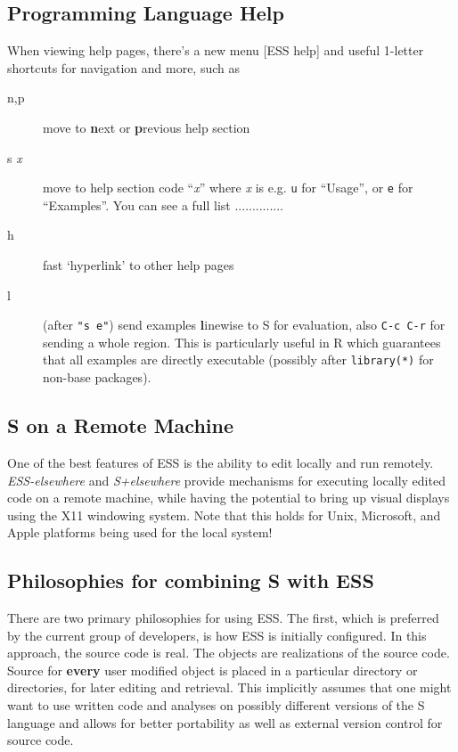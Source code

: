 \documentclass{article}
\begin{document}
\subsection{Programming Language Help}
\label{sec:S:help}
When viewing help pages, there's a new menu \textsf{[ESS help]} and
useful 1-letter shortcuts for navigation and more, such as
\begin{description}
\item[n,p] move to \textbf{n}ext or \textbf{p}revious help section
\item[s \textit{x}] move to help section code ``\textit{x}'' where
  \textit{x} is e.g. \texttt{u} for ``Usage'', or \texttt{e} for
  ``Examples''.  You can see a full list ..............

\item[h] fast `hyperlink' to other help pages

\item[l] (after \texttt{"s e"}) send examples \textbf{l}inewise to S for
  evaluation, also \texttt{C-c C-r} for sending a whole region.  This 
  is particularly useful in R which guarantees that all examples are
  directly executable (possibly after \texttt{library(*)} for non-base
  packages).
\end{description}

\subsection{S on a Remote Machine}
\label{sec:S:remote}

One of the best features of ESS is the ability to edit locally and run
remotely.  \textit{ESS-elsewhere} and \textit{S+elsewhere} provide
mechanisms for executing locally edited code on a remote machine,
while having the potential to bring up visual displays using the X11
windowing system.  Note that this holds for Unix, Microsoft, and Apple
platforms being used for the local system!

\subsection{Philosophies for combining S with ESS}
\label{sec:S:philosophy}

There are two primary philosophies for using ESS.  The first, which is
preferred by the current group of developers, is how ESS is initially
configured.  In this approach, the source code is real.  The objects
are realizations of the source code.  Source for \textbf{every} user
modified object is placed in a particular directory or directories,
for later editing and retrieval.  This implicitly assumes that one
might want to use written code and analyses on possibly different
versions of the S language and allows for better portability as well
as external version control for source code.
\end{document}
